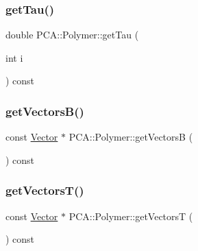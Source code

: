 \hypertarget{class_p_c_a_1_1_polymer_a01b636d898a08113ca9bf556447934ec}{}\label{class_p_c_a_1_1_polymer_a01b636d898a08113ca9bf556447934ec} 
\subsubsection{\texorpdfstring{get\+Tau()}{getTau()}}
{\footnotesize\ttfamily double P\+C\+A\+::\+Polymer\+::get\+Tau (\begin{DoxyParamCaption}\item[{int}]{i }\end{DoxyParamCaption}) const\hspace{0.3cm}{\ttfamily [inline]}}

\hypertarget{class_p_c_a_1_1_polymer_a4a90f901ceb688b0d96b126cc2ba3678}{}\label{class_p_c_a_1_1_polymer_a4a90f901ceb688b0d96b126cc2ba3678} 
\subsubsection{\texorpdfstring{get\+Vectors\+B()}{getVectorsB()}}
{\footnotesize\ttfamily const \hyperlink{class_p_c_a_1_1_vector}{Vector} $\ast$ P\+C\+A\+::\+Polymer\+::get\+VectorsB (\begin{DoxyParamCaption}{ }\end{DoxyParamCaption}) const}

\hypertarget{class_p_c_a_1_1_polymer_a83c92fb07eafc88d121ef4b4124319c3}{}\label{class_p_c_a_1_1_polymer_a83c92fb07eafc88d121ef4b4124319c3} 
\subsubsection{\texorpdfstring{get\+Vectors\+T()}{getVectorsT()}}
{\footnotesize\ttfamily const \hyperlink{class_p_c_a_1_1_vector}{Vector} $\ast$ P\+C\+A\+::\+Polymer\+::get\+VectorsT (\begin{DoxyParamCaption}{ }\end{DoxyParamCaption}) const}

\hypertarget{class_p_c_a_1_1_polymer_a3e498b6e57d98c9cc4d07a7aedb4b6a5}{}\label{class_p_c_a_1_1_polymer_a3e498b6e57d98c9cc4d07a7aedb4b6a5} 
